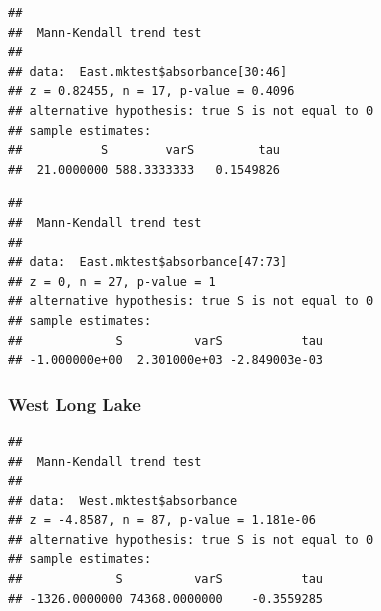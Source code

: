 \documentclass[12pt,]{article}
\newenvironment{Shaded}{\begin{snugshade}}{\end{snugshade}}
\newcommand{\KeywordTok}[1]{\textcolor[rgb]{0.13,0.29,0.53}{\textbf{#1}}}
\newcommand{\DecValTok}[1]{\textcolor[rgb]{0.00,0.00,0.81}{#1}}
\newcommand{\StringTok}[1]{\textcolor[rgb]{0.31,0.60,0.02}{#1}}
\newcommand{\CommentTok}[1]{\textcolor[rgb]{0.56,0.35,0.01}{\textit{#1}}}
\newcommand{\OperatorTok}[1]{\textcolor[rgb]{0.81,0.36,0.00}{\textbf{#1}}}
\newcommand{\NormalTok}[1]{#1}
\begin{document}
\begin{verbatim}
## 
##  Mann-Kendall trend test
## 
## data:  East.mktest$absorbance[30:46]
## z = 0.82455, n = 17, p-value = 0.4096
## alternative hypothesis: true S is not equal to 0
## sample estimates:
##           S        varS         tau 
##  21.0000000 588.3333333   0.1549826
\end{verbatim}

\begin{Shaded}
\end{Shaded}

\begin{verbatim}
## 
##  Mann-Kendall trend test
## 
## data:  East.mktest$absorbance[47:73]
## z = 0, n = 27, p-value = 1
## alternative hypothesis: true S is not equal to 0
## sample estimates:
##             S          varS           tau 
## -1.000000e+00  2.301000e+03 -2.849003e-03
\end{verbatim}

\subsubsection{West Long Lake}\label{west-long-lake}

\begin{Shaded}
\end{Shaded}

\begin{verbatim}
## 
##  Mann-Kendall trend test
## 
## data:  West.mktest$absorbance
## z = -4.8587, n = 87, p-value = 1.181e-06
## alternative hypothesis: true S is not equal to 0
## sample estimates:
##             S          varS           tau 
## -1326.0000000 74368.0000000    -0.3559285
\end{verbatim}
\end{document}
